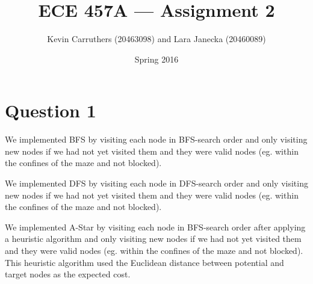 \documentclass[12pt]{article}
\begin{document}
\title{ECE 457A --- Assignment 2}
\author{Kevin Carruthers (20463098) and Lara Janecka (20460089)}
\date{\vspace{-2ex}Spring 2016}
\maketitle\HRule

\section*{Question 1}
We implemented BFS by visiting each node in BFS-search order and only visiting new nodes if we had not yet visited them and they were valid nodes (eg. within the confines of the maze and not blocked).

We implemented DFS by visiting each node in DFS-search order and only visiting new nodes if we had not yet visited them and they were valid nodes (eg. within the confines of the maze and not blocked).

We implemented A-Star by visiting each node in BFS-search order after applying a heuristic algorithm and only visiting new nodes if we had not yet visited them and they were valid nodes (eg. within the confines of the maze and not blocked). This heuristic algorithm used the Euclidean distance between potential and target nodes as the expected cost.
\end{document}
